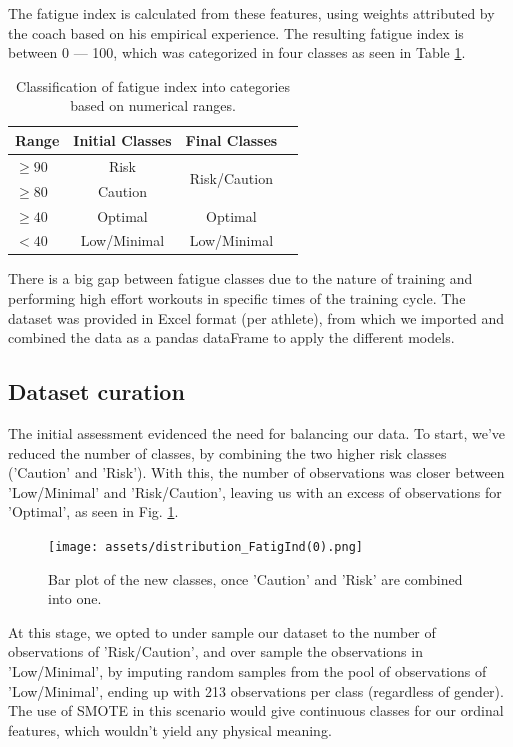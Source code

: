 \documentclass[conference]{IEEEtran}
\begin{document}
The fatigue index is calculated from these features, using weights attributed by the coach based on his empirical experience. The resulting fatigue index is between 0 — 100, which was categorized in four classes as seen in Table \ref{classTable}. 


\begin{table}[H]
\centering
\caption{Classification of fatigue index into categories based on numerical ranges.}
\label{classTable}
\begin{tabular}{lccc}
\toprule
\textbf{Range} & \textbf{Initial Classes} & \textbf{Final Classes} \\
\midrule
$\geq  90$ & Risk & \multirow{2}{*}{Risk/Caution} \\
$\geq  80$ & Caution & \\
$\geq 40$ & Optimal & Optimal \\
$< 40$ & Low/Minimal & Low/Minimal \\
\bottomrule
\end{tabular}
\end{table}


There is a big gap between fatigue classes due to the nature of training and performing high effort workouts in specific times of the training cycle. The dataset was provided in Excel format (per athlete), from which we imported and combined the data as a pandas dataFrame to apply the different models.



\subsection{Dataset curation}

The initial assessment evidenced the need for balancing our data. To start, we've reduced the number of classes, by combining the two higher risk classes ('Caution' and 'Risk'). With this, the number of observations was closer between 'Low/Minimal' and 'Risk/Caution', leaving us with an excess of observations for 'Optimal', as seen in Fig. \ref{histClasses}. 

\begin{figure}[H]
    \centering
    \texttt{[image: assets/distribution\_FatigInd(0).png]}
    \caption{Bar plot of the new classes, once 'Caution' and 'Risk' are combined into one.}
    \label{histClasses}
\end{figure} %

At this stage, we opted to under sample our dataset to the number of observations of 'Risk/Caution', and over sample the observations in 'Low/Minimal', by imputing random samples from the pool of observations of 'Low/Minimal', ending up with 213 observations per class (regardless of gender). The use of SMOTE in this scenario would give continuous classes for our ordinal features, which wouldn't yield any physical meaning.
\end{document}
